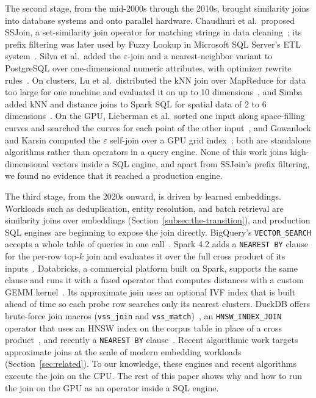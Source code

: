 The second stage, from the mid-2000s through the 2010s, brought similarity joins into database systems and onto parallel hardware.
Chaudhuri et al.\ proposed SSJoin, a set-similarity join operator for matching strings in data cleaning~\cite{ChaudhuriSSJoin06}; its prefix filtering was later used by Fuzzy Lookup in Microsoft SQL Server's ETL system~\cite{ArasuDataCleaning11}.
Silva et al.\ added the $\varepsilon$-join and a nearest-neighbor variant to PostgreSQL over one-dimensional numeric attributes, with optimizer rewrite rules~\cite{SilvaSimJoinOp10}.
On clusters, Lu et al.\ distributed the kNN join over MapReduce for data too large for one machine and evaluated it on up to 10 dimensions~\cite{LuKNNMapReduce12}, and Simba added kNN and distance joins to Spark SQL for spatial data of 2 to 6 dimensions~\cite{XieSimba16}.
On the GPU, Lieberman et al.\ sorted one input along space-filling curves and searched the curves for each point of the other input~\cite{LiebermanGPUSimJoin08}, and Gowanlock and Karsin computed the $\varepsilon$ self-join over a GPU grid index~\cite{GowanlockGPUSelfJoin19}; both are standalone algorithms rather than operators in a query engine.
None of this work joins high-dimensional vectors inside a SQL engine, and apart from SSJoin's prefix filtering, we found no evidence that it reached a production engine.

The third stage, from the 2020s onward, is driven by learned embeddings.
Workloads such as deduplication, entity resolution, and batch retrieval are similarity joins over embeddings (Section~\ref{subsec:the-transition}), and production SQL engines are beginning to expose the join directly.
BigQuery's \texttt{VECTOR\_SEARCH} accepts a whole table of queries in one call~\cite{BigQueryVectorSearchFn}.
Spark 4.2 adds a \texttt{NEAREST BY} clause for the per-row top-$k$ join and evaluates it over the full cross product of its inputs~\cite{ApacheSparkJIRA56395, SparkNearestByJoin26}.
Databricks, a commercial platform built on Spark, supports the same clause and runs it with a fused operator that computes distances with a custom GEMM kernel~\cite{DatabricksNearestByJoinBlog26}.
Its approximate join uses an optional IVF index that is built ahead of time so each probe row searches only its nearest clusters.
DuckDB offers brute-force join macros (\texttt{vss\_join} and \texttt{vss\_match})~\cite{DuckDBVSS}, an \texttt{HNSW\_INDEX\_JOIN} operator that uses an HNSW index on the corpus table in place of a cross product~\cite{DuckDBVSSBlog24}, and recently a \texttt{NEAREST BY} clause~\cite{DuckDBNearestByPR24137}.
Recent algorithmic work targets approximate joins at the scale of modern embedding workloads~\cite{XieSimJoin25, ChenDiskJoin25, KimVectorJoin26} (Section~\ref{sec:related}).
To our knowledge, these engines and recent algorithms execute the join on the CPU\@.
The rest of this paper shows why and how to run the join on the GPU as an operator inside a SQL engine.

